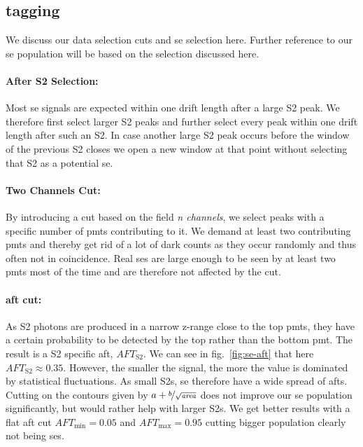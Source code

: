 
\FloatBarrier
\subsection{tagging}
\label{ssec:tagging}
\FloatBarrier


We discuss our data selection cuts and \gls{se} selection here.
Further reference to our \gls{se} population will be based on the selection discussed here.

\paragraph{After S2 Selection:} Most \gls{se} signals are expected within one drift length after a large S2 peak.
We therefore first select larger S2 peaks and further select every peak within one drift length after such an S2.
In case another large S2 peak occurs before the window of the previous S2 closes we open a new window at that point without selecting that S2 as a potential \gls{se}.


\paragraph{Two Channels Cut:} By introducing a cut based on the field \emph{n channels}, we select peaks with a specific number of \glspl{pmt} contributing to it.
We demand at least two contributing \glspl{pmt} and thereby get rid of a lot of dark counts as they occur randomly and thus often not in coincidence.
Real \glspl{se} are large enough to be seen by at least two \glspl{pmt} most of the time and are therefore not affected by the cut.

\paragraph{\gls{aft} cut:} As S2 photons are produced in a narrow z-range close to the top \glspl{pmt}, they have a certain probability to be detected by the top rather than the bottom \gls{pmt}.
The result is a S2 specific \gls{aft}, $ \mathit{AFT}_\mathrm{S2} $.
We can see in fig.~\ref{fig:se-aft} that here $ \mathit{AFT}_\mathrm{S2} \approx 0.35 $.  %
However, the smaller the signal, the more the value is dominated by statistical fluctuations.
As small S2s, \gls{se} therefore have a wide spread of \glspl{aft}.
Cutting on the contours given by $ a + \nicefrac{b}{\sqrt{\mathit{area}}} $ does not improve our \gls{se} population significantly, but would rather help with larger S2s.
We get better results with a flat \gls{aft} cut $ \mathit{AFT}_\mathrm{min} = 0.05 $ and $ \mathit{AFT}_\mathrm{max} = 0.95 $ cutting bigger population clearly not being \glspl{se}.

